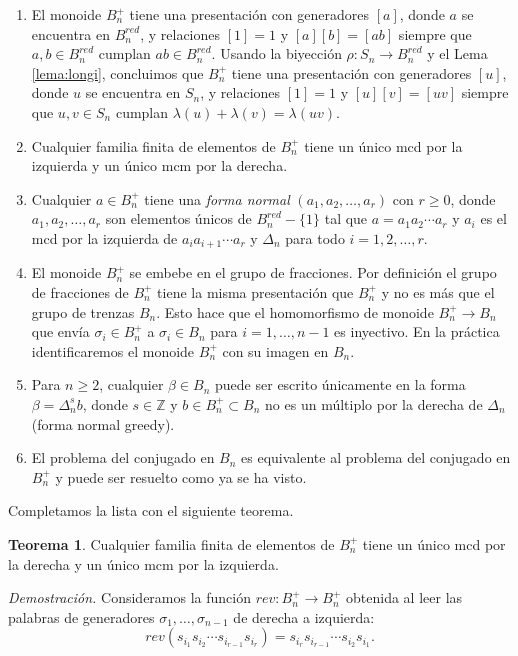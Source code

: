 \documentclass[12pt]{article}
\theoremstyle{definition}
\newtheorem{teor}{Teorema}[section]
\begin{document}
\begin{enumerate}[label=(\arabic*)]
\item El monoide $B_n^+$ tiene una presentación con generadores $[a]$, donde $a$ se encuentra en $B_n^{red}$, y relaciones $[1]=1$ y $[a][b]=[ab]$ siempre que $a,b\in B_n^{red}$ cumplan $ab\in B_n^{red}$. Usando la biyección $\rho: S_n\rightarrow B_n^{red}$ y el Lema \ref{lema:longi}, concluimos que $B_n^+$ tiene una presentación con generadores $[u]$, donde $u$ se encuentra en $S_n$, y relaciones $[1]=1$ y $[u][v]=[uv]$ siempre que $u,v\in S_n$ cumplan $\lambda(u)+\lambda(v)=\lambda(uv)$.
\item Cualquier familia finita de elementos de $B_n^+$ tiene un único mcd por la izquierda y un único mcm por la derecha.
\item Cualquier $a\in B_n^+$ tiene una \textit{forma normal} $(a_1,a_2,\ldots, a_r)$ con $r\geq 0$, donde $a_1,a_2,\ldots, a_r$ son elementos únicos de $B_n^{red}-\{1\}$ tal que $a=a_1a_2\cdots a_r$ y $a_i$ es el mcd por la izquierda de $a_ia_{i+1}\cdots a_r$ y $\Delta_n$ para todo $i=1,2,\ldots,r$.
\item El monoide $B_n^+$ se embebe en el grupo de fracciones. Por definición el grupo de fracciones de $B_n^+$ tiene la misma presentación que $B_n^+$ y no es más que el grupo de trenzas $B_n$. Esto hace que el homomorfismo de monoide $B_n^+\rightarrow B_n$ que envía $\sigma_i\in B_n^+$ a $\sigma_i\in B_n$ para $i=1,\ldots, n-1$ es inyectivo. En la práctica identificaremos el monoide $B_n^+$ con su imagen en $B_n$.
\item Para $n\geq 2$, cualquier $\beta\in B_n$ puede ser escrito únicamente en la forma $\beta=\Delta_n^sb$, donde $s\in\mathbb{Z}$ y $b\in B_n^+\subset B_n$ no es un múltiplo por la derecha de $\Delta_n$ (forma normal greedy).
\item El problema del conjugado en $B_n$ es equivalente al problema del conjugado en $B_n^+$ y puede ser resuelto como ya se ha visto.
\end{enumerate}

Completamos la lista con el siguiente teorema.

\begin{teor}
Cualquier familia finita de elementos de $B_n^+$ tiene un único mcd por la derecha y un único mcm por la izquierda.
\end{teor}
\textit{Demostración.} Consideramos la función $rev: B_n^+\rightarrow B_n^+$ obtenida al leer las palabras de generadores $\sigma_1,\ldots, \sigma_{n-1}$ de derecha a izquierda:
$$rev(s_{i_1}s_{i_2}\cdots s_{i_{r-1}}s_{i_r})=s_{i_r}s_{i_{r-1}}\cdots s_{i_{2}}s_{i_1}.$$
\end{document}

